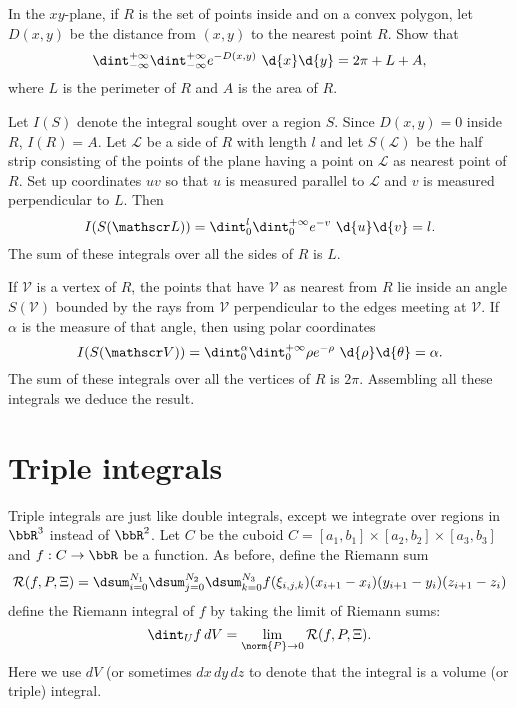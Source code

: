 \begin{pro} In the $xy$-plane, if $R$ is the set of points
inside and on a convex polygon, let $D(x, y)$ be the distance from
$(x, y)$ to the nearest point $R$. Show that
$$\dint _{-\infty} ^{+\infty}\dint _{-\infty} ^{+\infty} e^{-D(x, y)} \ \d{x} 
\d{y} = 2\pi +  L +
A,$$where $L$ is the perimeter of $R$ and $A$ is the area of $R$.
\begin{answer} Let $I(S)$ denote the integral sought over a region $S$. Since
$D(x, y) = 0$ inside $R$, $I(R) = A$. Let ${\mathscr  L}$ be a side
of $R$ with length $l$ and let $S({\mathscr  L})$ be the half strip
consisting of the points of the plane having a point on ${\mathscr
L}$ as nearest point of $R$. Set up coordinates $uv$ so that $u$ is
measured parallel to ${\mathscr  L}$ and $v$ is measured
perpendicular to $L$. Then
$$I(S({\mathscr  L})) = \dint _{0} ^{l}\dint _{0} ^{+\infty} e^{-v} \ \d{u}\d{v} 
=
l.$$The sum of these integrals over all the sides of $R$ is $L$.


If ${\mathscr  V}$ is a vertex of $R$, the points that have
${\mathscr  V}$ as nearest from $R$ lie inside an angle $S({\mathscr
V})$ bounded by the rays from ${\mathscr  V}$ perpendicular to the
edges meeting at ${\mathscr  V}$. If $\alpha$ is the measure of that
angle, then using polar coordinates
$$I(S({\mathscr  V})) = \dint _{0} ^{\alpha}\dint _{0} ^{+\infty} \rho e^{-\rho} 
\ \d{\rho} \d{\theta} =
\alpha.$$The sum of these integrals over all the vertices of $R$ is
$2\pi$. Assembling all these integrals we deduce the result.
\end{answer}
\end{pro}

  \section{Triple integrals}

  Triple integrals are just like double integrals, except we integrate over 
regions in $\bbR^3$ instead of $\bbR^2$.
  Let $C$ be the cuboid $C = [a_1, b_1] \times [a_2, b_2] \times [a_3, b_3]$ and 
$f:C \to \bbR$ be a function.
  As before, define the Riemann sum
  \begin{equation*}
    \mathcal R(f, P, \Xi)
      = \dsum_{i = 0}^{N_1} \dsum_{j = 0}^{N_2} \dsum_{k = 0}^{N_3} f( \xi_{i, 
j, k} ) (x_{i+1} - x_i)(y_{i+1} - y_i)(z_{i+1} - z_i)
  \end{equation*}
  define the Riemann integral of $f$ by taking the limit of Riemann sums:
  \begin{equation*}
    \dint_U f \, dV = \lim_{\norm{P} \to 0} \mathcal R(f, P, \Xi).
  \end{equation*}
  Here we use $dV$ (or sometimes $dx \, dy \, dz$ to denote that the integral is 
a volume (or triple) integral.

